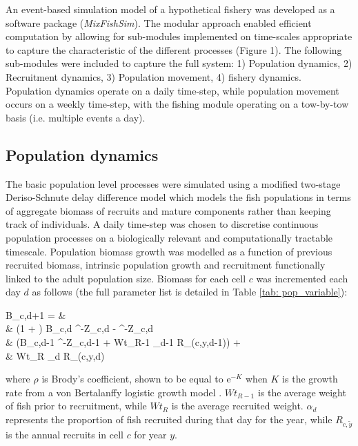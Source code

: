 \documentclass[review]{elsarticle}
\let\oldequation\equation
\let\oldendequation\endequation
\renewenvironment{equation}
 {\linenomathNonumbers\oldequation}
 {\oldendequation\endlinenomath}
\begin{document}
An event-based simulation model of a hypothetical fishery was developed as a
software package (\textit{MixFishSim}). The modular approach enabled efficient
computation by allowing for sub-modules implemented on time-scales appropriate
to capture the characteristic of the different processes (Figure 1). The
following sub-modules were included to capture the full system: 1) Population
dynamics, 2) Recruitment dynamics, 3) Population movement, 4) fishery
dynamics.\\

Population dynamics operate on a daily time-step, while population movement
occurs on a weekly time-step, with the fishing module operating on a tow-by-tow
basis (i.e.  multiple events a day). 

\subsection{Population dynamics}

The basic population level processes were simulated using a modified two-stage
Deriso-Schnute delay difference model which models the fish populations in
terms of aggregate biomass of recruits and mature components rather than
keeping track of individuals\citep{Deriso1980, Schnute1985, Dichmont2003}. A
daily time-step was chosen to discretise continuous population processes on a
biologically relevant and computationally tractable timescale. Population
biomass growth was modelled as a function of previous recruited biomass,
intrinsic population growth and recruitment functionally linked to the adult
population size.  Biomass for each cell $c$ was incremented each day $d$ as
follows (the full parameter list is detailed in Table \ref{tab: pop_variable}): 
\begin{equation}
	\begin{split}
	B_{c,d+1} = &\\
	& (1 + \rho) B_{c,d} \cdot {}^{-Z_{c,d}} - \rho \cdot
	^{-Z_{c,d}} \hspace{2.9cm}
	\times \\  
	& (B_{c,d-1} \cdot {}^{-Z_{c,d-1}} + Wt_{R-1} \cdot \alpha_{d-1} \cdot
	R_{(c,y,d-1)})
	\hspace{0.4cm} + \\
	& Wt_{R} \cdot \alpha_{d} \cdot R_{(c,y,d)} 
	\end{split}
\end{equation}
where $\rho$ is Brody's coefficient, shown to be equal to $\mathrm{e}^{-K}$
when $K$ is the growth rate from a von Bertalanffy logistic growth model
\citep{Schnute1985}. $Wt_{R-1}$ is the average weight of fish prior to
recruitment, while $Wt_{R}$ is the average recruited weight. $\alpha_{d}$
represents the proportion of fish recruited during that day for the year, while
$R_{c,\tilde{y}}$ is the annual recruits in cell $c$ for year $y$. \\
\end{document}
